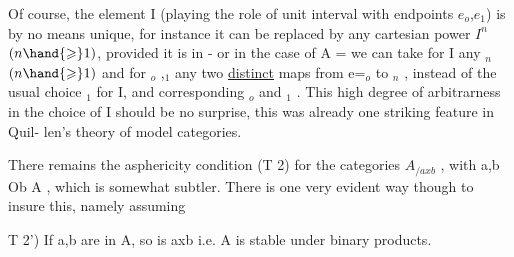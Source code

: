 
Of course,  the element I  (playing the role of unit interval with
endpoints $e_o$,$e_1$) is by no means unique,  for instance it can be replaced
by any cartesian power $I^n$ $(n\hand{\geqslant} 1)$,  provided it is in   -  or in the case
of A = \hand{$\Delta$}  we can take for I any \hand{$\Delta$}$_n$ $(n\hand{\geqslant} 1)$ and for \hand{$\delta$}$_o$ ,\hand{$\delta$}$_1$ any two \uline{distinct}
maps from e=\hand{$\Delta$}$_o$ to \hand{$\Delta$}$_n$ , instead of the usual choice  \hand{$\Delta$}$_1$ for I, and
corresponding \hand{$\delta$}$_o$ and \hand{$\delta$}$_1$ .  This high degree of arbitrarness in the choice
of I should be no surprise,  this was already one striking feature in Quil-%
len's theory of model categories.

There remains the asphericity condition (T 2)  for the categories
$A_{/axb}$ ,  with  a,b \hand{$\in$} Ob A ,  which is somewhat subtler.  There is one very
evident way though to insure this, namely assuming

T 2')  If a,b are in A,  so is axb  i.e. A is stable under binary products.


